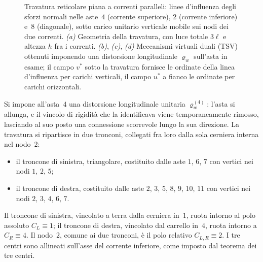 \begin{esempio}
\begin{svolgimento}
\begin{figure}[htbp]
{%
			}
			\caption{Travatura reticolare piana a correnti paralleli: linee d'influenza
				degli sforzi normali nelle aste~$4$ (corrente superiore),
				$2$ (corrente inferiore) e~$8$ (diagonale), sotto carico unitario
				verticale mobile sui nodi dei due correnti.
				\emph{(a)} Geometria della travatura, con luce totale $3\ell$ e altezza
				$h$ fra i correnti.
				\emph{(b)}, \emph{(c)}, \emph{(d)} Meccanismi virtuali duali (TSV)
				ottenuti imponendo una distorsione longitudinale $\varrho_w$ sull'asta
				in esame; il campo $v^*$ sotto la travatura fornisce le ordinate della
				linea d'influenza per carichi verticali, il campo $u^*$ a fianco le
				ordinate per carichi orizzontali.}
			\label{fig:LI_reticolare}
		\end{figure}
		
		Si impone all'asta~$4$ una distorsione longitudinale unitaria
		$\varrho_w^{(4)}$: l'asta si allunga, e il vincolo di rigidità che
		la identificava viene temporaneamente rimosso, lasciando al suo
		posto una connessione scorrevole lungo la sua direzione. La
		travatura si ripartisce in due tronconi, collegati fra loro dalla
		sola cerniera interna nel nodo~$2$:
		\begin{itemize}[noitemsep,topsep=2pt]
			\item il troncone di sinistra, triangolare, costituito dalle
			aste $1$, $6$, $7$ con vertici nei nodi $1$, $2$, $5$;
			\item il troncone di destra, costituito dalle aste $2$, $3$,
			$5$, $8$, $9$, $10$, $11$ con vertici nei nodi $2$, $3$, $4$,
			$6$, $7$.
		\end{itemize}
		Il troncone di sinistra, vincolato a terra dalla cerniera in~$1$,
		ruota intorno al polo assoluto $C_L\equiv 1$; il troncone di
		destra, vincolato dal carrello in~$4$, ruota intorno a $C_R\equiv 4$.
		Il nodo~$2$, comune ai due tronconi, è il polo relativo
		$C_{L,R}\equiv 2$. I tre centri sono allineati sull'asse del
		corrente inferiore, come imposto dal teorema dei tre centri.
		

\end{svolgimento}
\end{esempio}
